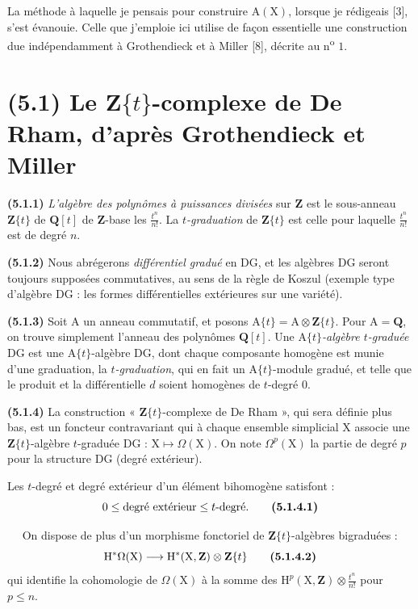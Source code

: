 \documentclass[11pt,leqno]{article}
\newcommand{\Page}[1]{\ifvmode\noindent\else\unskip\ \fi{\footnotesize\textcolor{gray}{[p.\,#1]}}\ \ignorespaces}
\begin{document}
La méthode à laquelle je pensais pour construire \(\mathrm{A}(\mathrm{X})\), lorsque je rédigeais [3], s’est évanouie. Celle que j’emploie ici utilise de façon essentielle une construction due indépendamment à Grothendieck et à Miller [8], décrite au n\textsuperscript{o} \(1\).

\section*{(5.1) Le \(\mathbf{Z}\{t\}\)-complexe de De Rham, d’après Grothendieck et Miller}

\textbf{(5.1.1)} \textit{L’algèbre des polynômes à puissances divisées} sur \(\mathbf{Z}\) est le sous-anneau \(\mathbf{Z}\{t\}\) de \(\mathbf{Q}[t]\) de \(\mathbf{Z}\)-base les \(\frac{t^n}{n!}\). La \textit{\(t\)-graduation} de \(\mathbf{Z}\{t\}\) est celle pour laquelle \(\frac{t^n}{n!}\) est de degré \(n\).

\textbf{(5.1.2)} Nous abrégerons \textit{différentiel gradué} en DG, et les algèbres DG seront toujours supposées commutatives, au sens de la règle de Koszul (exemple type d’algèbre DG : les formes différentielles extérieures sur une variété).

\textbf{(5.1.3)} Soit \(\mathrm{A}\) un anneau commutatif, et posons \(\mathrm{A}\{t\}=\mathrm{A}\otimes\mathbf{Z}\{t\}\). Pour \(\mathrm{A}=\mathbf{Q}\), on trouve simplement l’anneau des polynômes \(\mathbf{Q}[t]\). Une \(\mathrm{A}\{t\}\)\textit{-algèbre \(t\)-graduée} DG est une \(\mathrm{A}\{t\}\)-algèbre DG, dont chaque composante homogène est munie d’une graduation, la \textit{\(t\)-graduation}, qui en fait un \(\mathrm{A}\{t\}\)-module gradué, et telle que le produit et la différentielle \(d\) soient homogènes de \(t\)-degré \(0\).

\textbf{(5.1.4)} La construction « \(\mathbf{Z}\{t\}\)-complexe de De Rham », qui sera définie plus bas, est un foncteur contravariant qui à chaque ensemble simplicial \(\mathrm{X}\) associe une \(\mathbf{Z}\{t\}\)-algèbre \(t\)-graduée DG : \(\mathrm{X}\mapsto\Omega(\mathrm{X})\). On note \(\Omega^p(\mathrm{X})\) la partie de degré \(p\) pour la structure DG (degré extérieur).

Les \(t\)-degré et degré extérieur d’un élément bihomogène satisfont :
\[
0\leq\text{degré extérieur}\leq t\text{-degré}.
\tag*{\textbf{(5.1.4.1)}}
\]

\Page{235}
On dispose de plus d’un morphisme fonctoriel de \(\mathbf{Z}\{t\}\)-algèbres bigraduées :
\[
\mathrm{H}^*\Omega(\mathrm{X})
\longrightarrow
\mathrm{H}^*(\mathrm{X},\mathbf{Z})\otimes\mathbf{Z}\{t\}
\tag*{\textbf{(5.1.4.2)}}
\]
qui identifie la cohomologie de \(\Omega(\mathrm{X})\) à la somme des \(\mathrm{H}^p(\mathrm{X},\mathbf{Z})\otimes\frac{t^n}{n!}\) pour \(p\leq n\).
\end{document}
